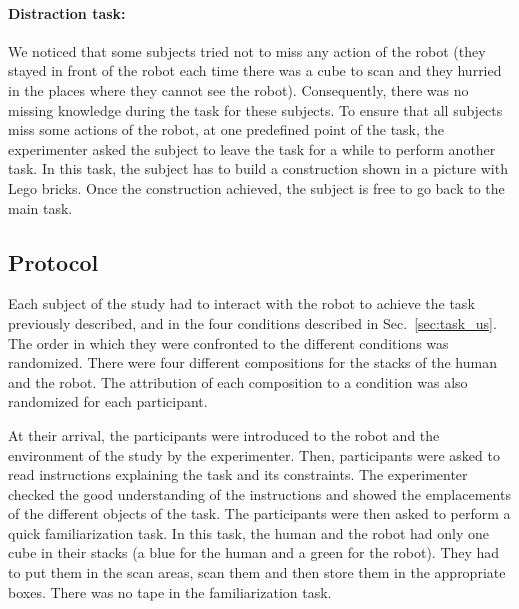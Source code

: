 \documentclass[english,a4paper,11pt,twoside]{StyleThese}
\begin{document}
\paragraph{Distraction task:}
We noticed that some subjects tried not to miss any action of the robot (they stayed in front of the robot each time there was a cube to scan and they hurried in the places where they cannot see the robot). Consequently, there was no missing knowledge during the task for these subjects. To ensure that all subjects miss some actions of the robot, at one predefined point of the task, the experimenter asked the subject to leave the task for a while to perform another task. In this task, the subject has to build a construction shown in a picture with Lego bricks. Once the construction achieved, the subject is free to go back to the main task.

\subsection{Protocol}

Each subject of the study had to interact with the robot to achieve the task previously described, and in the four conditions described in Sec.~\ref{sec:task_us}. The order in which they were confronted to the different conditions was randomized. There were four different compositions for the stacks of the human and the robot. The attribution of each composition to a condition was also randomized for each participant.

At their arrival, the participants were introduced to the robot and the environment of the study by the experimenter. Then, participants were asked to read instructions explaining the task and its constraints. The experimenter checked the good understanding of the instructions and showed the emplacements of the different objects of the task. The participants were then asked to perform a quick familiarization task. In this task, the human and the robot had only one cube in their stacks (a blue for the human and a green for the robot). They had to put them in the scan areas, scan them and then store them in the appropriate boxes. There was no tape in the familiarization task. 
\end{document}
